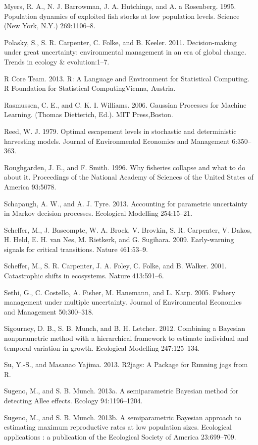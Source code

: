 \documentclass[author-year, 12pt,review]{components/elsarticle} %
\begin{document}
Myers, R. A., N. J. Barrowman, J. A. Hutchings, and A. a Rosenberg.
1995. Population dynamics of exploited fish stocks at low population
levels. Science (New York, N.Y.) 269:1106--8.

Polasky, S., S. R. Carpenter, C. Folke, and B. Keeler. 2011.
Decision-making under great uncertainty: environmental management in an
era of global change. Trends in ecology \& evolution:1--7.

R Core Team. 2013. R: A Language and Environment for Statistical
Computing. R Foundation for Statistical ComputingVienna, Austria.

Rasmussen, C. E., and C. K. I. Williams. 2006. Gaussian Processes for
Machine Learning. (Thomas Dietterich, Ed.). MIT Press,Boston.

Reed, W. J. 1979. Optimal escapement levels in stochastic and
deterministic harvesting models. Journal of Environmental Economics and
Management 6:350--363.

Roughgarden, J. E., and F. Smith. 1996. Why fisheries collapse and what
to do about it. Proceedings of the National Academy of Sciences of the
United States of America 93:5078.

Schapaugh, A. W., and A. J. Tyre. 2013. Accounting for parametric
uncertainty in Markov decision processes. Ecological Modelling
254:15--21.

Scheffer, M., J. Bascompte, W. A. Brock, V. Brovkin, S. R. Carpenter, V.
Dakos, H. Held, E. H. van Nes, M. Rietkerk, and G. Sugihara. 2009.
Early-warning signals for critical transitions. Nature 461:53--9.

Scheffer, M., S. R. Carpenter, J. A. Foley, C. Folke, and B. Walker.
2001. Catastrophic shifts in ecosystems. Nature 413:591--6.

Sethi, G., C. Costello, A. Fisher, M. Hanemann, and L. Karp. 2005.
Fishery management under multiple uncertainty. Journal of Environmental
Economics and Management 50:300--318.

Sigourney, D. B., S. B. Munch, and B. H. Letcher. 2012. Combining a
Bayesian nonparametric method with a hierarchical framework to estimate
individual and temporal variation in growth. Ecological Modelling
247:125--134.

Su, Y.-S., and Masanao Yajima. 2013. R2jags: A Package for Running jags
from R.

Sugeno, M., and S. B. Munch. 2013a. A semiparametric Bayesian method for
detecting Allee effects. Ecology 94:1196--1204.

Sugeno, M., and S. B. Munch. 2013b. A semiparametric Bayesian approach
to estimating maximum reproductive rates at low population sizes.
Ecological applications : a publication of the Ecological Society of
America 23:699--709.
\end{document}
